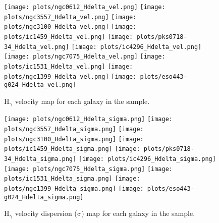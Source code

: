 \documentclass[fleqn,usenatbib,useAMS]{mnras}
\begin{document}
        \begin{figure*}
            \centering
            \texttt{[image: plots/ngc0612\_Hdelta\_vel.png]}
            \texttt{[image: plots/ngc3557\_Hdelta\_vel.png]}
            \texttt{[image: plots/ngc3100\_Hdelta\_vel.png]}
            \texttt{[image: plots/ic1459\_Hdelta\_vel.png]}
            \texttt{[image: plots/pks0718-34\_Hdelta\_vel.png]}
            \texttt{[image: plots/ic4296\_Hdelta\_vel.png]}
            \texttt{[image: plots/ngc7075\_Hdelta\_vel.png]}
            \texttt{[image: plots/ic1531\_Hdelta\_vel.png]}
            \texttt{[image: plots/ngc1399\_Hdelta\_vel.png]}
            \texttt{[image: plots/eso443-g024\_Hdelta\_vel.png]}
            \caption{H$_\mathrm{\gamma}$ velocity map for each galaxy in the sample.}
            \label{fig:Hdelta_vel}
        \end{figure*}


        \begin{figure*}
            \centering
            \texttt{[image: plots/ngc0612\_Hdelta\_sigma.png]}
            \texttt{[image: plots/ngc3557\_Hdelta\_sigma.png]}
            \texttt{[image: plots/ngc3100\_Hdelta\_sigma.png]}
            \texttt{[image: plots/ic1459\_Hdelta\_sigma.png]}
            \texttt{[image: plots/pks0718-34\_Hdelta\_sigma.png]}
            \texttt{[image: plots/ic4296\_Hdelta\_sigma.png]}
            \texttt{[image: plots/ngc7075\_Hdelta\_sigma.png]}
            \texttt{[image: plots/ic1531\_Hdelta\_sigma.png]}
            \texttt{[image: plots/ngc1399\_Hdelta\_sigma.png]}
            \texttt{[image: plots/eso443-g024\_Hdelta\_sigma.png]}
            \caption{H$_\mathrm{\gamma}$ velocity dispersion ($\mathrm{\sigma}$) map for each galaxy in the sample.}
            \label{fig:Hdelta_sigma}
        \end{figure*}
\end{document}
